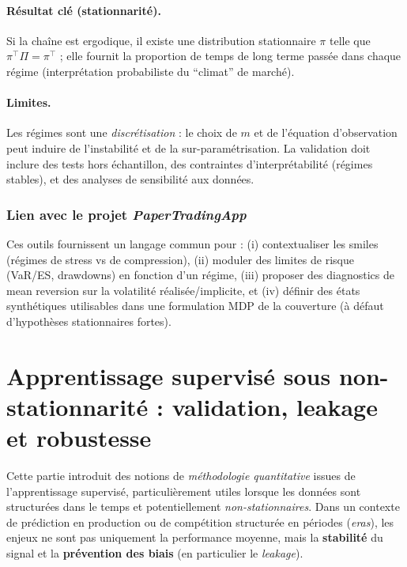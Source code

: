\documentclass[11pt,a4paper]{article}
\newcommand{\1}{\mathbf{1}}
\begin{document}
\paragraph{R\'esultat cl\'e (stationnarit\'e).}
Si la cha\^ine est ergodique, il existe une distribution stationnaire $\pi$ telle que $\pi^\top \Pi=\pi^\top$ ; elle fournit la proportion
de temps de long terme pass\'ee dans chaque r\'egime (interpr\'etation probabiliste du ``climat'' de march\'e).

\paragraph{Limites.}
Les r\'egimes sont une \emph{discr\'etisation} : le choix de $m$ et de l'\'equation d'observation peut induire de l'instabilit\'e et de la
sur-param\'etrisation. La validation doit inclure des tests hors \'echantillon, des contraintes d'interpr\'etabilit\'e (r\'egimes stables),
et des analyses de sensibilit\'e aux donn\'ees.

\subsubsection{Lien avec le projet \emph{PaperTradingApp}}

Ces outils fournissent un langage commun pour : (i) contextualiser les smiles (r\'egimes de stress vs de compression),
(ii) moduler des limites de risque (VaR/ES, drawdowns) en fonction d'un r\'egime, (iii) proposer des diagnostics de mean reversion sur la
volatilité r\'ealis\'ee/implicite, et (iv) d\'efinir des \'etats synth\'etiques utilisables dans une formulation MDP de la couverture
(\`a d\'efaut d'hypoth\`eses stationnaires fortes).

\section{Apprentissage supervis\'e sous non-stationnarit\'e : validation, leakage et robustesse}

Cette partie introduit des notions de \emph{m\'ethodologie quantitative} issues de l'apprentissage supervis\'e, particuli\`erement utiles
lorsque les donn\'ees sont structur\'ees dans le temps et potentiellement \emph{non-stationnaires}. Dans un contexte de pr\'ediction en production
ou de comp\'etition structur\'ee en p\'eriodes (\emph{eras}), les enjeux ne sont pas uniquement la performance moyenne, mais la \textbf{stabilit\'e}
du signal et la \textbf{pr\'evention des biais} (en particulier le \emph{leakage}).
\end{document}
